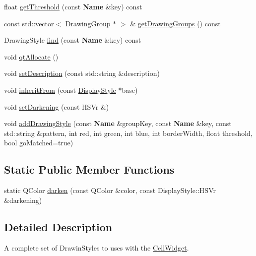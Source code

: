 \begin{DoxyCompactItemize}
\item 
float \hyperlink{classHurricane_1_1DisplayStyle_ac4a7a7bfede6747aad9980fd7f375b8d}{get\+Threshold} (const \textbf{ Name} \&key) const
\item 
const std\+::vector$<$ Drawing\+Group $\ast$ $>$ \& \hyperlink{classHurricane_1_1DisplayStyle_ad85904fb9c823e5f0193461a5e4f9a1a}{get\+Drawing\+Groups} () const
\item 
Drawing\+Style \hyperlink{classHurricane_1_1DisplayStyle_ac7a76fdc5cf9e9a74840b9846bd390fc}{find} (const \textbf{ Name} \&key) const
\item 
void \hyperlink{classHurricane_1_1DisplayStyle_a9288b2780ffd5fccf94a41b597ed2efd}{qt\+Allocate} ()
\item 
void \hyperlink{classHurricane_1_1DisplayStyle_ae21071635857843536511f21da5533c7}{set\+Description} (const std\+::string \&description)
\item 
void \hyperlink{classHurricane_1_1DisplayStyle_a603dbd5d6973a8897a85513acdfda2d0}{inherit\+From} (const \hyperlink{classHurricane_1_1DisplayStyle}{Display\+Style} $\ast$base)
\item 
void \hyperlink{classHurricane_1_1DisplayStyle_ab17b746af2c529c62a902d0cb992be34}{set\+Darkening} (const H\+S\+Vr \&)
\item 
void \hyperlink{classHurricane_1_1DisplayStyle_aef2473891e0de472850f95cbd71b2cf4}{add\+Drawing\+Style} (const \textbf{ Name} \&group\+Key, const \textbf{ Name} \&key, const std\+::string \&pattern, int red, int green, int blue, int border\+Width, float threshold, bool go\+Matched=true)
\end{DoxyCompactItemize}
\subsection*{Static Public Member Functions}
\begin{DoxyCompactItemize}
\item 
static Q\+Color \hyperlink{classHurricane_1_1DisplayStyle_ab19987c4a2d971163749b7ab56b5597b}{darken} (const Q\+Color \&color, const Display\+Style\+::\+H\+S\+Vr \&darkening)
\end{DoxyCompactItemize}


\subsection{Detailed Description}
A complete set of Drawin\+Styles to uses with the \hyperlink{classHurricane_1_1CellWidget}{Cell\+Widget}. 

